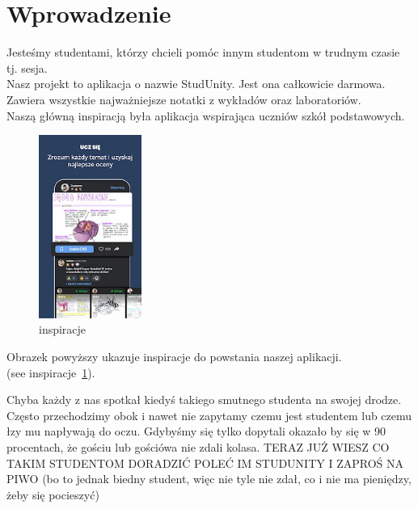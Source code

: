\section{Wprowadzenie}
\label{sec:Wprowadzenie}

    Jesteśmy studentami, którzy chcieli pomóc innym studentom w trudnym czasie tj. sesja. \\ 
    Nasz projekt to aplikacja o nazwie StudUnity. Jest ona całkowicie darmowa. Zawiera wszystkie najważniejsze notatki z wykładów oraz laboratoriów. \\ Naszą główną inspiracją była aplikacja wspirająca uczniów szkół podstawowych.
    
\begin{figure}[htbp]
    \centering
    \includegraphics[width=0.3\textwidth]{pictures/inspriracje.jpg}
    \caption{inspiracje}
    \label{fig:inspiracje}
\end{figure}

\noindent Obrazek powyższy ukazuje inspiracje do powstania naszej aplikacji.\\
(see inspiracje~\ref{fig:inspiracje}).

    Chyba każdy z nas spotkał kiedyś takiego smutnego studenta na swojej drodze. Często przechodzimy obok i nawet nie zapytamy czemu jest studentem lub czemu łzy mu         napływają do oczu. 
    Gdybyśmy się tylko dopytali okazało by się w 90 procentach, że gościu lub gościówa nie zdali kolasa. 
    {{\huge TERAZ JUŻ WIESZ CO TAKIM STUDENTOM DORADZIĆ}}
    {{\Huge POLEĆ IM STUDUNITY I ZAPROŚ NA PIWO}}
    (bo to jednak biedny student, więc nie tyle nie zdał, co i nie ma pieniędzy, żeby się pocieszyć)


